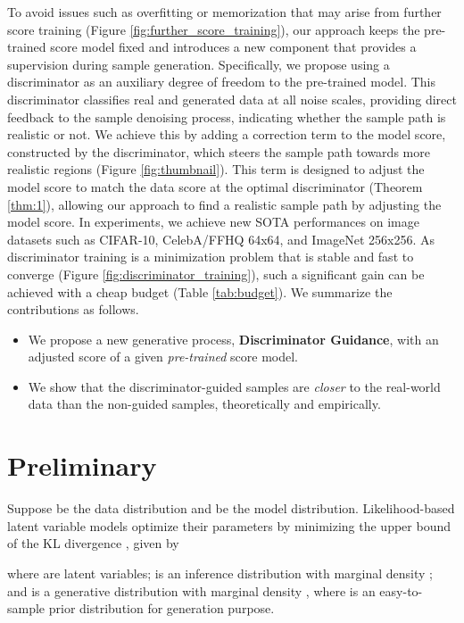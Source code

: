 \documentclass{article}
\theoremstyle{plain}
\theoremstyle{definition}
\theoremstyle{remark}
\begin{document}
To avoid issues such as overfitting \cite{nichol2021improved} or memorization \cite{carlini2023extracting} that may arise from further score training (Figure \ref{fig:further_score_training}), our approach keeps the pre-trained score model fixed and introduces a new component that provides a supervision during sample generation. Specifically, we propose using a discriminator as an auxiliary degree of freedom to the pre-trained model. This discriminator classifies real and generated data at all noise scales, providing direct feedback to the sample denoising process, indicating whether the sample path is realistic or not. We achieve this by adding a correction term to the model score, constructed by the discriminator, which steers the sample path towards more realistic regions (Figure \ref{fig:thumbnail}). This term is designed to adjust the model score to match the data score at the optimal discriminator (Theorem \ref{thm:1}), allowing our approach to find a realistic sample path by adjusting the model score. In experiments, we achieve new SOTA performances on image datasets such as CIFAR-10, CelebA/FFHQ 64x64, and ImageNet 256x256. As discriminator training is a minimization problem that is stable and fast to converge (Figure \ref{fig:discriminator_training}), such a significant gain can be achieved with a cheap budget (Table \ref{tab:budget}). We summarize the contributions as follows.


\vspace{-2mm}
\begin{itemize}\setlength\itemsep{0.2em}
	\item[\checkmark] We propose a new generative process, \textbf{Discriminator Guidance}, with an adjusted score of a given \textit{pre-trained} score model.
	\item[\checkmark] We show that the discriminator-guided samples are \textit{closer} to the real-world data than the non-guided samples, theoretically and empirically.
\end{itemize}
\vspace{-2mm}

\section{Preliminary}

Suppose  be the data distribution and  be the model distribution. Likelihood-based latent variable models optimize their parameters by minimizing the upper bound of the KL divergence , given by

where  are  latent variables;  is an inference distribution with marginal density ; and  is a generative distribution with marginal density , where  is an easy-to-sample prior distribution for generation purpose.
\end{document}
